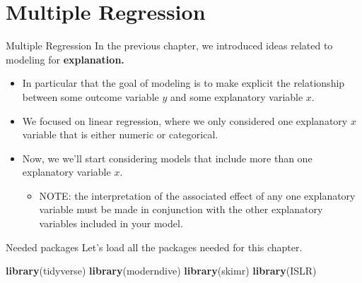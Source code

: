 \documentclass[
  ignorenonframetext,
]{beamer}
\newenvironment{Shaded}{\begin{snugshade}}{\end{snugshade}}
\newcommand{\FunctionTok}[1]{\textcolor[rgb]{0.13,0.29,0.53}{\textbf{#1}}}
\newcommand{\NormalTok}[1]{#1}
\providecommand{\tightlist}{%
  \setlength{\itemsep}{0pt}\setlength{\parskip}{0pt}}
\begin{document}
\hypertarget{multiple-regression}{%
\section{Multiple Regression}\label{multiple-regression}}

\begin{frame}{Multiple Regression}
\protect\hypertarget{multiple-regression-1}{}
In the previous chapter, we introduced ideas related to modeling for
\textbf{explanation.}

\begin{itemize}
\item
  In particular that the goal of modeling is to make explicit the
  relationship between some outcome variable \(y\) and some explanatory
  variable \(x\).
\item
  We focused on linear regression, where we only considered one
  explanatory \(x\) variable that is either numeric or categorical.
\item
  Now, we we'll start considering models that include more than one
  explanatory variable \(x\).

  \begin{itemize}
  \tightlist
  \item
    NOTE: the interpretation of the associated effect of any one
    explanatory variable must be made in conjunction with the other
    explanatory variables included in your model.
  \end{itemize}
\end{itemize}
\end{frame}

\begin{frame}[fragile]{Needed packages}
\protect\hypertarget{needed-packages-1}{}
Let's load all the packages needed for this chapter.

\normalsize

\begin{Shaded}
\begin{Highlighting}[]
\FunctionTok{library}\NormalTok{(tidyverse) }
\FunctionTok{library}\NormalTok{(moderndive)}
\FunctionTok{library}\NormalTok{(skimr)}
\FunctionTok{library}\NormalTok{(ISLR)}
\end{Highlighting}
\end{Shaded}

\normalsize
\end{frame}
\end{document}
